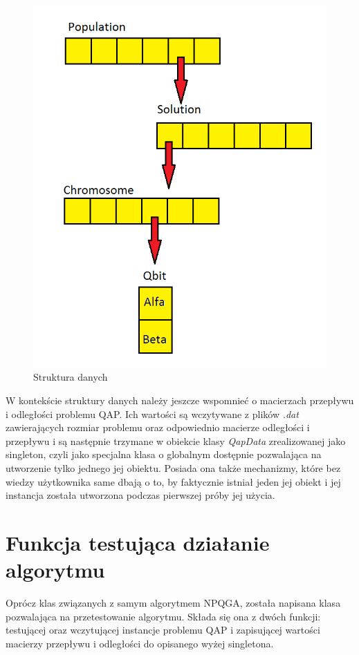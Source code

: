 \begin{figure}[!t]
\includegraphics[scale=0.4]{data_structure}
\caption{Struktura danych}
\end{figure}

W kontekście struktury danych należy jeszcze wspomnieć o macierzach przepływu i odległości problemu QAP. Ich wartości są wczytywane z plików \textit{.dat} zawierających rozmiar problemu oraz odpowiednio macierze odległości i przepływu i są następnie trzymane w obiekcie klasy \textit{QapData} zrealizowanej jako singleton, czyli jako specjalna klasa o globalnym dostępnie pozwalająca na utworzenie tylko jednego jej obiektu. Posiada ona także mechanizmy, które bez wiedzy użytkownika same dbają o to, by faktycznie istniał jeden jej obiekt i jej instancja została utworzona podczas pierwszej próby jej użycia.

\section{Funkcja testująca działanie algorytmu}
Oprócz klas związanych z samym algorytmem NPQGA, została napisana klasa pozwalająca na przetestowanie algorytmu. Składa się ona z dwóch funkcji: testującej oraz wczytującej instancje problemu QAP i zapisującej wartości macierzy przepływu i odległości do opisanego wyżej singletona.

